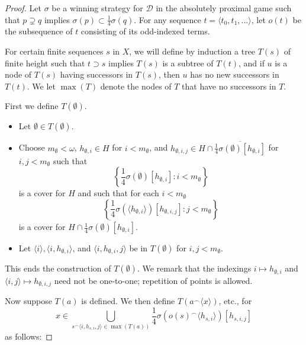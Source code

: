 \documentclass{amsart}
\theoremstyle{definition}
\theoremstyle{remark}
\newcommand{\<}{\langle}
\renewcommand{\>}{\rangle}
\newcommand{\cl}[1]{\overline{#1}}
\newcommand{\pl}[1]{\mathscr{#1}}
\newcommand{\concat}{^\frown}
\begin{document}
\begin{proof}
  Let $\sigma$ be a winning strategy for $\pl D$ in the absolutely proximal game such that $p\supsetneq q$ implies $\sigma(p)\subset \frac{1}{4}\sigma(q)$.
  For any sequence $t=\<t_0,t_1,\dots\>$, let $o(t)$ be the subsequence of $t$ consisting of its odd-indexed terms.

  For certain finite sequences $s$ in $X$, we will define by induction a tree $T(s)$ of finite height such that $t\supset s$ implies $T(s)$ is a subtree of $T(t)$, and if $u$ is a node of $T(s)$ having successors in $T(s)$, then $u$ has no new successors in $T(t)$.   We let $\max(T)$ denote the nodes of $T$ that have no successors in $T$.

  \bigskip

First we define $T(\emptyset)$.

  \begin{itemize}
    \item Let $\emptyset\in T(\emptyset)$.
    \item Choose $m_\emptyset<\omega$, $h_{\emptyset,i}\in H$ for $i<m_\emptyset$, and $h_{\emptyset,i,j}\in H\cap\cl{\frac{1}{4}\sigma(\emptyset)[h_{\emptyset,i}]}$ for $i,j<m_\emptyset$ such that
      \[
        \left\{\frac{1}{4}\sigma(\emptyset)[h_{\emptyset,i}]:i<m_\emptyset\right\}
      \]
    is a cover for $H$ and such that for each $i<m_\emptyset$
      \[
        \left\{\frac{1}{4}\sigma(\<h_{\emptyset,i}\>)[h_{\emptyset,i,j}]:j<m_\emptyset\right\}
      \]
    is a cover for $H\cap\cl{\frac{1}{4}\sigma(\emptyset)[h_{\emptyset,i}]}$.
    \item Let $\<i\>, \<i,h_{\emptyset,i}\>$, and $\<i,h_{\emptyset,i},j\>$ be in $T(\emptyset)$ for $i,j<m_\emptyset$.
  \end{itemize}
This ends the construction of $T(\emptyset)$.   We remark that the indexings $i\mapsto h_{\emptyset,i}$ and $\<i,j\>\mapsto h_{\emptyset,i, j}$ need not be one-to-one; repetition of points is allowed.

\bigskip

  Now suppose $T(a)$ is defined. We then define $T(a\concat\<x\>)$, etc., for
    \[
      x\in \bigcup_{s\concat\<i,h_{s,i},j\>\in\max(T(a))} \frac{1}{4}\sigma(o(s)\concat\<h_{s,i}\>)[h_{s,i,j}]
    \]
  as follows:


\end{proof}
\end{document}
